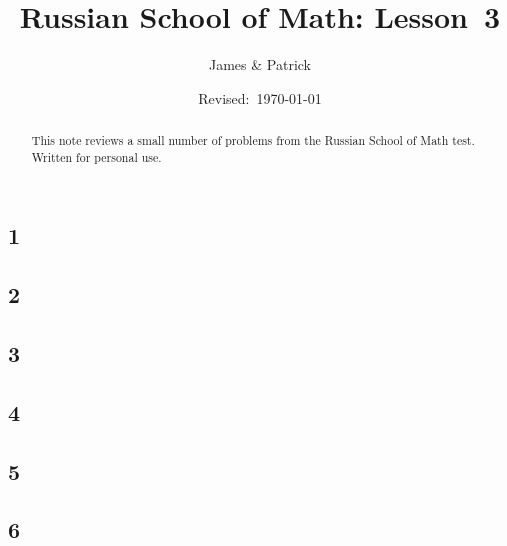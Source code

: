 \documentclass[12pt]{article}
\title{Russian School of Math: Lesson~3}
\author{James \& Patrick}
\date{Revised:~\today}
\begin{document}
\maketitle
\begin{abstract}\setlength{\parindent}{0pt}%
This note reviews a small number of problems from the Russian School of Math test. Written for personal use.
\end{abstract}

\thispagestyle{empty}
\clearpage

\subsection*{1}

\begin{solution}
  
\end{solution}

\subsection*{2}

\begin{solution}
  
\end{solution}

\subsection*{3}

\begin{solution}
  
\end{solution}

\subsection*{4}

\begin{solution}
  
\end{solution}

\subsection*{5}

\begin{solution}
  
\end{solution}

\subsection*{6}

\begin{solution}
  
\end{solution}
\end{document}
